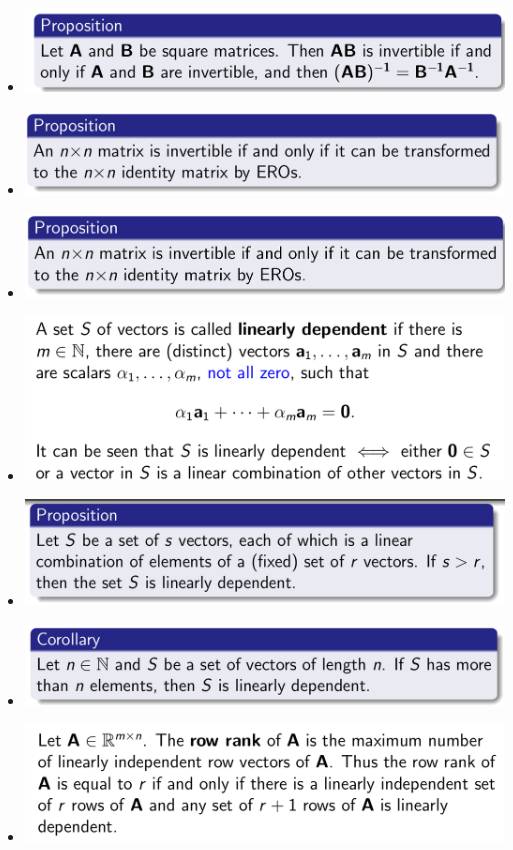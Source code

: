 \documentclass{article}
\begin{document}
\begin{itemize}
  \item \includegraphics[scale = 0.4]{14.png}
  \item \includegraphics[scale = 0.4]{15.png}
  \item \includegraphics[scale = 0.3]{16.png}
  \item \includegraphics[scale = 0.4]{17.png}
  \item \includegraphics[scale = 0.4]{18.png}
  \item \includegraphics[scale = 0.4]{19.png}
  \item \includegraphics[scale = 0.4]{20.png}

\end{itemize}
\end{document}
